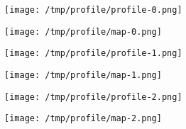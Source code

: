 \documentclass[a4paper]{article}
\begin{document}
\begin{center}
  \texttt{[image: /tmp/profile/profile-0.png]}
\end{center}
\begin{flushright}
  \texttt{[image: /tmp/profile/map-0.png]}
\end{flushright}

\begin{center}
  \texttt{[image: /tmp/profile/profile-1.png]}
\end{center}
\begin{flushright}
  \texttt{[image: /tmp/profile/map-1.png]}
\end{flushright}

\begin{center}
  \texttt{[image: /tmp/profile/profile-2.png]}
\end{center}
\begin{flushright}
  \texttt{[image: /tmp/profile/map-2.png]}
\end{flushright}
\end{document}
